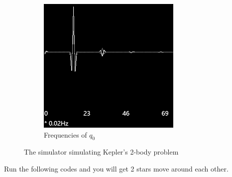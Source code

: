 \documentclass[12pt]{article}
\begin{document}
\begin{figure}[h]
\begin{subfigure}[b]{0.2\linewidth}
    \includegraphics[width=\linewidth]{kepler_2_body_q0_frequencies.png}
    \caption{Frequencies of $q_0$}
  \end{subfigure}
  \caption{The simulator simulating Kepler's 2-body problem}
  \label{fig:kepler}
\end{figure}

Run the following codes and you will get 2 stars move around each other.
\end{document}

